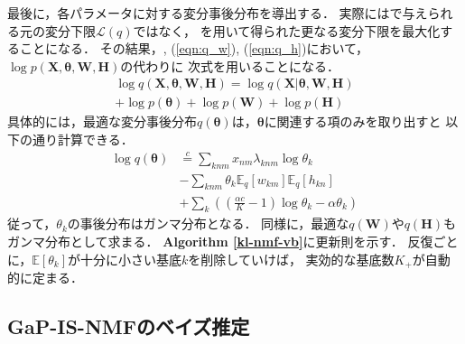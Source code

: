 最後に，各パラメータに対する変分事後分布を導出する．
実際にはで与えられる元の変分下限$\mathcal{L}(q)$ではなく，
を用いて得られた更なる変分下限を最大化することになる．
その結果，, (\ref{eqn:q_w}), (\ref{eqn:q_h})において，
$\log p(\bm{X},\bm\theta,\bm{W},\bm{H})$の代わりに
次式を用いることになる．
\begin{eqnarray}
\log q(\bm{X},\bm\theta,\bm{W},\bm{H}) 
= \log q(\bm{X}|\bm\theta,\bm{W},\bm{H})
\nonumber\\
+ \log p(\bm\theta) + \log p(\bm{W}) + \log p(\bm{H})
\end{eqnarray}
具体的には，最適な変分事後分布$q(\bm\theta)$は，$\bm\theta$に関連する項のみを取り出すと
以下の通り計算できる．
\begin{align}
\log q(\bm\theta) 
&\overset{c}{=}
\sum_{knm} x_{nm} \lambda_{knm} \log \theta_k
\nonumber\\
&
- \sum_{knm} \theta_k \mathbb{E}_{q}\!\left[w_{km}\right] \mathbb{E}_{q}\!\left[h_{kn}\right]
\nonumber\\
&
+ \sum_{k} \left( \left(\frac{\alpha c}{K} - 1\right) \log \theta_k - \alpha \theta_k \right)
\end{align}
従って，$\theta_k$の事後分布はガンマ分布となる．
同様に，最適な$q(\bm{W})$や$q(\bm{H})$もガンマ分布として求まる．
{\bf Algorithm \ref{kl-nmf-vb}}に更新則を示す．
反復ごとに，$\mathbb{E}[\theta_k]$が十分に小さい基底$k$を削除していけば，
実効的な基底数$K_+$が自動的に定まる．

\subsection{GaP-IS-NMFのベイズ推定}

